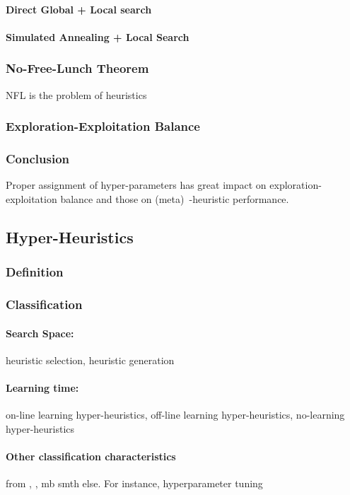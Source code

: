 \paragraph{Direct Global + Local search} \cite{syrjakow1999efficient}
\paragraph{Simulated Annealing + Local Search} \cite{martin1996combining}

\subsubsection{No-Free-Lunch Theorem}
NFL is the problem of heuristics\cite{wolpert1997no}
\subsubsection{Exploration-Exploitation Balance}
\subsubsection{Conclusion} 
Proper assignment of hyper-parameters has great impact on exploration-exploitation balance and those on (meta)~-heuristic performance. 

\subsection{Hyper-Heuristics}
\subsubsection{Definition}
\subsubsection{Classification}
\paragraph{Search Space:} heuristic selection, heuristic generation
\paragraph{Learning time:} on-line learning hyper-heuristics, off-line learning hyper-heuristics, no-learning hyper-heuristics
\paragraph{Other classification characteristics} from \cite{surv:kerschke2019automated}, \cite{burke2019classification}, mb smth else. For instance, hyperparameter tuning
